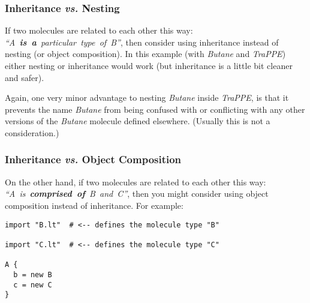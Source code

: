 \documentclass[11pt]{article}
\begin{document}
\subsubsection{Inheritance \textit{vs.} Nesting}
\label{sec:inheritance_vs_nesting}
If two molecules are related to each other this way:
\mbox{\textit{``A \textbf{is a} particular type of B''}},
then consider using inheritance instead of nesting
(or object composition).
In this example (with \textit{Butane} and \textit{TraPPE})
either nesting or inheritance would work
(but inheritance is a little bit cleaner and safer).

  Again, one very minor advantage to nesting 
\textit{Butane} inside \textit{TraPPE}, is that it prevents the name
\textit{Butane} from being confused with or conflicting with any other 
versions of the \textit{Butane} molecule defined elsewhere.
(Usually this is not a consideration.)

\subsubsection{Inheritance \textit{vs.} Object Composition}
\label{sec:inheritance_vs_object_composition}
On the other hand, if two molecules are related to each other this way:
\mbox{\textit{``A is \textbf{comprised of} B and C''}},
then you might consider using object composition instead of inheritance.
For example:
\begin{verbatim}
import "B.lt"  # <-- defines the molecule type "B"

import "C.lt"  # <-- defines the molecule type "C"

A {
  b = new B
  c = new C
}
\end{verbatim}
\end{document}
